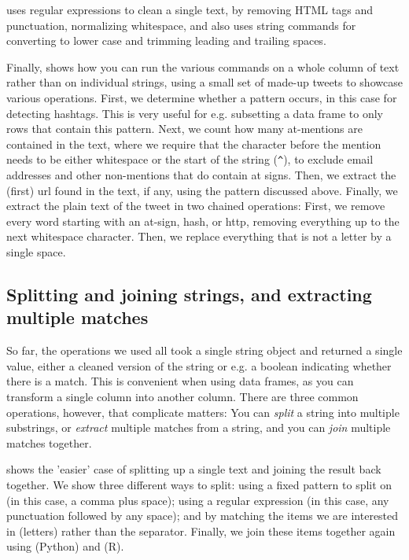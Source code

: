  uses regular expressions to clean a single text, by removing HTML tags and punctuation,
normalizing whitespace, and also uses string commands for converting to lower case and trimming leading and trailing spaces.


Finally,  shows how you can run the various commands on a whole column of text rather than on individual strings,
using  a small set of made-up tweets to showcase various operations.
First, we determine whether a pattern occurs, in this case for detecting hashtags.
This is very useful for e.g. subsetting a data frame to only rows that contain this pattern.
Next, we count how many at-mentions are contained in the text, where we require that the character before the mention needs to be either whitespace or the start of the string (\verb|^|), to exclude email addresses and other non-mentions that do contain at signs.
Then, we extract the (first) url found in the text, if any, using the pattern discussed above.
Finally, we extract the plain text of the tweet in two chained operations:
First, we remove every word starting with an at-sign, hash, or http, removing everything up to the next whitespace character.
Then, we replace everything that is not a letter by a single space. 



\subsection{Splitting and joining strings, and extracting multiple matches}

So far, the operations we used all took a single string object and returned a single value,
either a cleaned version of the string or e.g. a boolean indicating whether there is a match.
This is convenient when using data frames, as you can transform a single column into another column.
There are three common operations, however, that complicate matters:
You can \emph{split} a string into multiple substrings, or \emph{extract} multiple matches from a string,
and you can \emph{join} multiple matches together.


 shows the 'easier' case of splitting up a single text and joining the result back together.
We show three different ways to split: using a fixed pattern to split on (in this case, a comma plus space);
using a regular expression (in this case, any punctuation followed by any space);
and by matching the items we are interested in (letters) rather than the separator.
Finally, we join these items together again using  (Python) and  (R).

